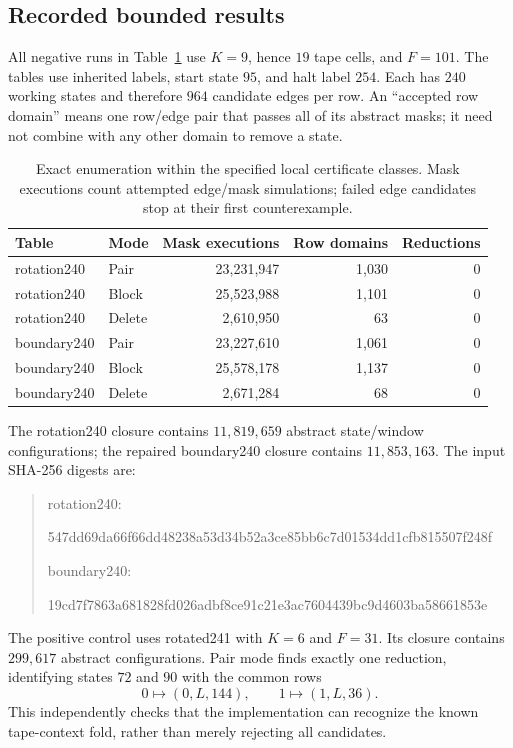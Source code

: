 \subsection{Recorded bounded results}

All negative runs in Table~\ref{tab:fold-search-results} use
$K=9$, hence $19$ tape cells, and $F=101$.  The tables use inherited
labels, start state $95$, and halt label $254$.  Each has $240$
working states and therefore $964$ candidate edges per row.  An
``accepted row domain'' means one row/edge pair that passes all of
its abstract masks; it need not combine with any other domain to
remove a state.

\begin{table}[htbp]
\centering
\begin{tabular}{llrrr}
Table & Mode & Mask executions & Row domains & Reductions \\
\hline
rotation240 & Pair   & 23,231,947 & 1,030 & 0 \\
rotation240 & Block  & 25,523,988 & 1,101 & 0 \\
rotation240 & Delete & 2,610,950  & 63    & 0 \\
boundary240 & Pair   & 23,227,610 & 1,061 & 0 \\
boundary240 & Block  & 25,578,178 & 1,137 & 0 \\
boundary240 & Delete & 2,671,284  & 68    & 0 \\
\hline
\end{tabular}
\caption{Exact enumeration within the specified local certificate
classes.  Mask executions count attempted edge/mask simulations;
failed edge candidates stop at their first counterexample.}
\label{tab:fold-search-results}
\end{table}

The rotation240 closure contains $11,819,659$ abstract state/window
configurations; the repaired boundary240 closure contains $11,853,163$.
The input SHA-256 digests are:
\begin{quote}\small\ttfamily
rotation240:\par
547dd69da66f66dd48238a53d34b52a3ce85bb6c7d01534dd1cfb815507f248f\par
boundary240:\par
19cd7f7863a681828fd026adbf8ce91c21e3ac7604439bc9d4603ba58661853e
\end{quote}

The positive control uses rotated241 with $K=6$ and $F=31$.
Its closure contains $299,617$ abstract configurations.  Pair mode
finds exactly one reduction, identifying states $72$ and $90$ with
the common rows
\[
  0\mapsto (0,L,144),\qquad 1\mapsto (1,L,36).
\]
This independently checks that the implementation can recognize the
known tape-context fold, rather than merely rejecting all candidates.

